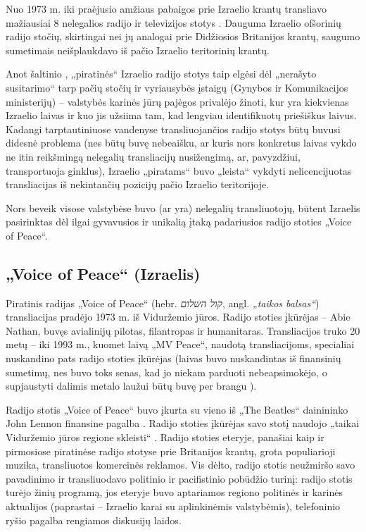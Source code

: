 \documentclass[kursinis-darbas]{vukf}
\begin{document}
Nuo 1973 m. iki praėjusio amžiaus pabaigos prie Izraelio krantų transliavo mažiausiai 8 nelegalios radijo ir televizijos stotys \cite{soundscapes_the_worlds_last_offshore_radio_stations}. Dauguma Izraelio ofšorinių radijo stočių, skirtingai nei jų analogai prie Didžiosios Britanijos krantų, saugumo sumetimais neišplaukdavo iš pačio Izraelio teritorinių krantų.

Anot šaltinio \cite{offshore_radio_israel}, „piratinės“ Izraelio radijo stotys taip elgėsi dėl „nerašyto susitarimo“ tarp pačių stočių ir vyriausybės įstaigų (Gynybos ir Komunikacijos ministerijų) – valstybės karinės jūrų pajėgos privalėjo žinoti, kur yra kiekvienas Izraelio laivas ir kuo jis užsiima tam, kad lengviau identifikuotų priešiškus laivus. Kadangi tarptautiniuose vandenyse transliuojančios radijo stotys būtų buvusi didesnė problema (nes būtų buvę nebeaišku, ar kuris nors konkretus laivas vykdo ne itin reikšmingą nelegalių transliacijų nusižengimą, ar, pavyzdžiui, transportuoja ginklus), Izraelio „piratams“ buvo „leista“ vykdyti nelicencijuotas transliacijas iš nekintančių pozicijų pačio Izraelio teritorijoje.

Nors beveik visose valstybėse buvo (ar yra) nelegalių transliuotojų, būtent Izraelis pasirinktas dėl ilgai gyvavusios ir unikalią įtaką padariusios radijo stoties „Voice of Peace“.

\subsection{„Voice of Peace“ (Izraelis)}

Piratinis radijas „Voice of Peace“ (hebr. \emph{קול השלום}, angl. \emph{„taikos balsas“}) transliacijas pradėjo 1973 m. iš Viduržemio jūros. Radijo stoties įkūrėjas – Abie Nathan, buvęs avialinijų pilotas, filantropas ir humanitaras. Transliacijos truko 20 metų – iki 1993 m., kuomet laivą „MV Peace“, naudotą transliacijoms, specialiai nuskandino pats radijo stoties įkūrėjas \cite{soundscapes_voice_of_peace} (laivas buvo nuskandintas iš finansinių sumetimų, nes buvo toks senas, kad jo niekam parduoti nebeapsimokėjo, o supjaustyti dalimis metalo laužui būtų buvę per brangu \cite{soundscapes_the_worlds_last_offshore_radio_stations}).

Radijo stotis „Voice of Peace“ buvo įkurta su vieno iš „The Beatles“ dainininko John Lennon finansine pagalba \cite{soundscapes_talking_peace_in_new_york}. Radijo stoties įkūrėjas savo stotį naudojo „taikai Viduržemio jūros regione skleisti“ \cite{soundscapes_abie_nathans_peace_programme}. Radijo stoties eteryje, panašiai kaip ir pirmosiose piratinėse radijo stotyse prie Britanijos krantų, grota populiarioji muzika, transliuotos komercinės reklamos. Vis dėlto, radijo stotis neužmiršo savo pavadinimo ir transliuodavo politinio ir pacifistinio pobūdžio turinį: radijo stotis turėjo žinių programą, jos eteryje buvo aptariamos regiono politinės ir karinės aktualijos (paprastai – Izraelio karai su aplinkinėmis valstybėmis), telefoninio ryšio pagalba rengiamos diskusijų laidos.
\end{document}
